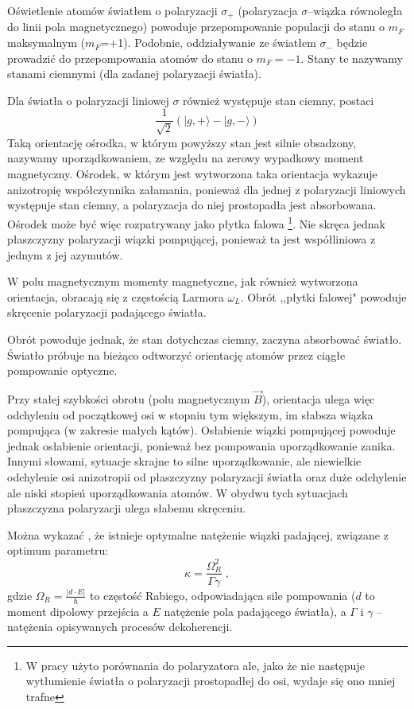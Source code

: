 \documentclass[a4paper,10pt]{article}
\begin{document}
Oświetlenie atomów światłem o polaryzacji $\sigma_+$ (polaryzacja $\sigma$--wiązka równoległa do linii pola magnetycznego) powoduje przepompowanie populacji do stanu o $m_F$ maksymalnym ($m_F$=+1). Podobnie, oddziaływanie ze światłem $\sigma_-$ będzie prowadzić do przepompowania atomów do stanu o $m_F=-1$. Stany te nazywamy stanami ciemnymi (dla zadanej polaryzacji światła).

Dla światła o polaryzacji liniowej $\sigma$ również występuje stan ciemny, postaci
\begin{equation}
\frac{1}{\sqrt{2}} (|g,+\rangle-|g,-\rangle)
\end{equation}
Taką orientację ośrodka, w którym powyższy stan jest silnie obsadzony, nazywamy uporządkowaniem, ze względu na zerowy wypadkowy moment magnetyczny. Ośrodek, w którym jest wytworzona taka orientacja wykazuje anizotropię współczynnika załamania, ponieważ dla jednej z polaryzacji liniowych występuje stan ciemny, a polaryzacja do niej prostopadła jest absorbowana. Ośrodek może być więc rozpatrywany jako płytka falowa \footnote{W pracy \cite{rotpol} użyto porównania do polaryzatora ale, jako że nie następuje wytłumienie światła o polaryzacji prostopadłej do osi, wydaje się ono mniej trafne}.  Nie skręca jednak płaszczyzny polaryzacji wiązki pompującej, ponieważ ta jest współliniowa z jednym z jej azymutów.

W polu magnetycznym momenty magnetyczne, jak również wytworzona orientacja, obracają się z częstością Larmora $\omega_L$. Obrót ,,płytki falowej" powoduje skręcenie polaryzacji padającego światła.

Obrót powoduje jednak, że stan dotychczas ciemny, zaczyna absorbować światło. Światło próbuje na bieżąco odtworzyć orientację atomów przez ciągłe pompowanie optyczne.

Przy stałej szybkości obrotu (polu magnetycznym $\vec B$), orientacja ulega więc odchyleniu od początkowej osi w stopniu tym większym, im słabsza wiązka pompująca (w zakresie małych kątów). Osłabienie wiązki pompującej powoduje jednak osłabienie orientacji, ponieważ bez pompowania uporządkowanie zanika. Innymi słowami, sytuacje skrajne to silne uporządkowanie, ale niewielkie odchylenie osi anizotropii od płaszczyzny polaryzacji światła oraz duże odchylenie ale niski stopień uporządkowania atomów. W obydwu tych sytuacjach płaszczyzna polaryzacji ulega słabemu skręceniu.

Można wykazać \cite{srivansan}, że istnieje optymalne natężenie wiązki padającej, związane z optimum parametru:
\begin{equation}
\kappa=\frac{\Omega_R^2}{\Gamma\gamma} \; ,
\end{equation}
gdzie $\Omega_R=\frac{|d \cdot E|}{\hbar}$ to częstość Rabiego, odpowiadająca sile pompowania ($d$ to moment dipolowy przejścia a $E$ natężenie pola padającego światła), a $\Gamma$ i $\gamma$ -- natężenia opisywanych procesów dekoherencji.
\end{document}
